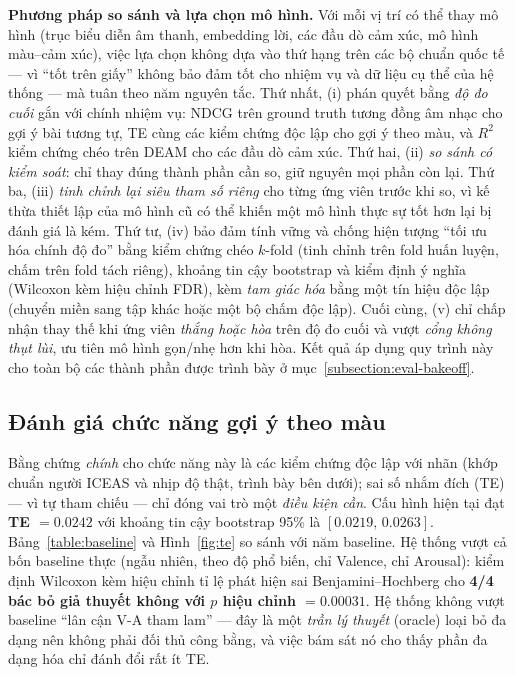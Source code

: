 \documentclass[../DoAn.tex]{subfiles}
\begin{document}
\textbf{Phương pháp so sánh và lựa chọn mô hình.} Với mỗi vị trí có thể thay mô hình (trục biểu diễn âm thanh, embedding lời, các đầu dò cảm xúc, mô hình màu--cảm xúc), việc lựa chọn không dựa vào thứ hạng trên các bộ chuẩn quốc tế --- vì ``tốt trên giấy'' không bảo đảm tốt cho nhiệm vụ và dữ liệu cụ thể của hệ thống --- mà tuân theo năm nguyên tắc. Thứ nhất, (i) phán quyết bằng \textit{độ đo cuối} gắn với chính nhiệm vụ: NDCG trên ground truth tương đồng âm nhạc cho gợi ý bài tương tự, TE cùng các kiểm chứng độc lập cho gợi ý theo màu, và $R^2$ kiểm chứng chéo trên DEAM cho các đầu dò cảm xúc. Thứ hai, (ii) \textit{so sánh có kiểm soát}: chỉ thay đúng thành phần cần so, giữ nguyên mọi phần còn lại. Thứ ba, (iii) \textit{tinh chỉnh lại siêu tham số riêng} cho từng ứng viên trước khi so, vì kế thừa thiết lập của mô hình cũ có thể khiến một mô hình thực sự tốt hơn lại bị đánh giá là kém. Thứ tư, (iv) bảo đảm tính vững và chống hiện tượng ``tối ưu hóa chính độ đo'' bằng kiểm chứng chéo $k$-fold (tinh chỉnh trên fold huấn luyện, chấm trên fold tách riêng), khoảng tin cậy bootstrap và kiểm định ý nghĩa (Wilcoxon kèm hiệu chỉnh FDR), kèm \textit{tam giác hóa} bằng một tín hiệu độc lập (chuyển miền sang tập khác hoặc một bộ chấm độc lập). Cuối cùng, (v) chỉ chấp nhận thay thế khi ứng viên \textit{thắng hoặc hòa} trên độ đo cuối và vượt \textit{cổng không thụt lùi}, ưu tiên mô hình gọn/nhẹ hơn khi hòa. Kết quả áp dụng quy trình này cho toàn bộ các thành phần được trình bày ở mục~\ref{subsection:eval-bakeoff}.

\subsection{Đánh giá chức năng gợi ý theo màu}
\label{subsection:eval-color}
Bằng chứng \textit{chính} cho chức năng này là các kiểm chứng độc lập với nhãn (khớp chuẩn người ICEAS và nhịp độ thật, trình bày bên dưới); sai số nhắm đích (TE) --- vì tự tham chiếu --- chỉ đóng vai trò một \textit{điều kiện cần}. Cấu hình hiện tại đạt \textbf{TE $= 0.0242$} với khoảng tin cậy bootstrap 95\% là $[0.0219,\,0.0263]$. Bảng~\ref{table:baseline} và Hình~\ref{fig:te} so sánh với năm baseline. Hệ thống vượt cả bốn baseline thực (ngẫu nhiên, theo độ phổ biến, chỉ Valence, chỉ Arousal): kiểm định Wilcoxon kèm hiệu chỉnh tỉ lệ phát hiện sai Benjamini--Hochberg \cite{benjamini1995fdr} cho \textbf{4/4 bác bỏ giả thuyết không với $p$ hiệu chỉnh $= 0.00031$}. Hệ thống không vượt baseline ``lân cận V-A tham lam'' --- đây là một \textit{trần lý thuyết} (oracle) loại bỏ đa dạng nên không phải đối thủ công bằng, và việc bám sát nó cho thấy phần đa dạng hóa chỉ đánh đổi rất ít TE.
\end{document}
